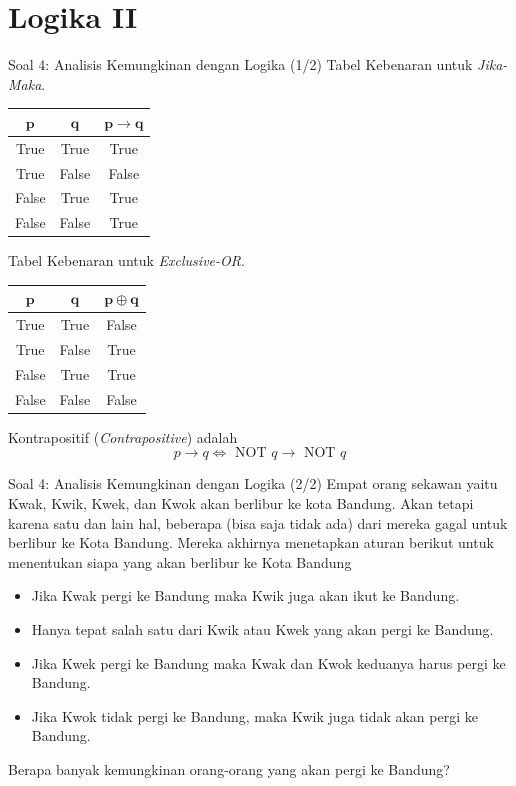 \documentclass[english,t]{beamer}
\begin{document}
\section{Logika II}
\begin{frame}{Soal 4: Analisis Kemungkinan dengan Logika (1/2)}
Tabel Kebenaran untuk \textit{Jika-Maka}.

\begin{table}[!ht]
\centering
\begin{tabular}{|c|c|c|}
\hline
$\bm{p}$ & $\bm{q}$ & $\bm{p \longrightarrow q}$ \\
\hline
True  & True & True \\
\hline
True  & False & False \\
\hline
False & True & True \\
\hline
False & False & True \\
\hline
\end{tabular}
\end{table}

Tabel Kebenaran untuk \textit{Exclusive-OR}.

\begin{table}[!ht]
\centering
\begin{tabular}{|c|c|c|}
\hline
$\bm{p}$ & $\bm{q}$ & $\bm{p \oplus q}$ \\
\hline
True  & True & False \\
\hline
True  & False & True \\
\hline
False & True & True \\
\hline
False & False & False \\
\hline
\end{tabular}
\end{table}

Kontrapositif (\textit{Contrapositive}) adalah
\begin{equation*}
p \longrightarrow q \Longleftrightarrow \text{ NOT }q \longrightarrow \text{ NOT }q
\end{equation*}
\end{frame}

\begin{frame}{Soal 4: Analisis Kemungkinan dengan Logika (2/2)}
Empat orang sekawan yaitu Kwak, Kwik, Kwek, dan Kwok akan berlibur ke kota Bandung. Akan tetapi karena satu dan lain hal, beberapa (bisa saja tidak ada) dari mereka gagal untuk berlibur ke Kota Bandung. Mereka akhirnya menetapkan aturan berikut untuk menentukan siapa yang akan berlibur ke Kota Bandung

\begin{itemize}
	\item Jika Kwak pergi ke Bandung maka Kwik juga akan ikut ke Bandung.
	\item Hanya tepat salah satu dari Kwik atau Kwek yang akan pergi ke Bandung.
	\item Jika Kwek pergi ke Bandung maka Kwak dan Kwok keduanya harus pergi ke Bandung.
	\item Jika Kwok tidak pergi ke Bandung, maka Kwik juga tidak akan pergi ke Bandung.
\end{itemize}

Berapa banyak kemungkinan orang-orang yang akan pergi ke Bandung?
\end{frame}
\end{document}
